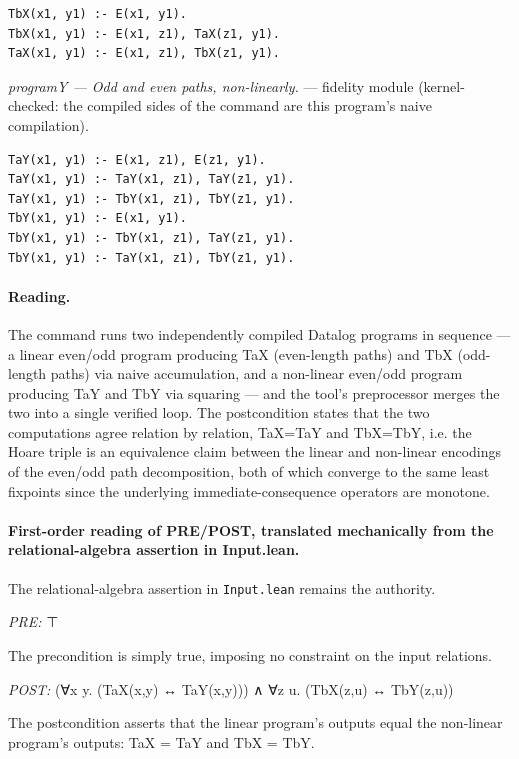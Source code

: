 \documentclass[10pt]{article}
\begin{document}
\begin{Verbatim}[fontsize=\scriptsize,breaklines=true,breakanywhere=true,frame=single,framesep=1.5mm]
TbX(x1, y1) :- E(x1, y1).
TbX(x1, y1) :- E(x1, z1), TaX(z1, y1).
TaX(x1, y1) :- E(x1, z1), TbX(z1, y1).
\end{Verbatim}

{\raggedright\textit{programY --- Odd and even paths, non-linearly.} --- fidelity module (kernel-checked: the compiled sides of the command are this program's naive compilation).\par}

\begin{Verbatim}[fontsize=\scriptsize,breaklines=true,breakanywhere=true,frame=single,framesep=1.5mm]
TaY(x1, y1) :- E(x1, z1), E(z1, y1).
TaY(x1, y1) :- TaY(x1, z1), TaY(z1, y1).
TaY(x1, y1) :- TbY(x1, z1), TbY(z1, y1).
TbY(x1, y1) :- E(x1, y1).
TbY(x1, y1) :- TbY(x1, z1), TaY(z1, y1).
TbY(x1, y1) :- TaY(x1, z1), TbY(z1, y1).
\end{Verbatim}

\paragraph{Reading.} The command runs two independently compiled Datalog programs in sequence --- a linear even/odd program producing TaX (even-length paths) and TbX (odd-length paths) via naive accumulation, and a non-linear even/odd program producing TaY and TbY via squaring --- and the tool's preprocessor merges the two into a single verified loop. The postcondition states that the two computations agree relation by relation, TaX=TaY and TbX=TbY, i.e. the Hoare triple is an equivalence claim between the linear and non-linear encodings of the even/odd path decomposition, both of which converge to the same least fixpoints since the underlying immediate-consequence operators are monotone.

\paragraph{First-order reading of PRE/POST, translated mechanically from the relational-algebra assertion in Input.lean.} The relational-algebra assertion in \texttt{Input.lean} remains the authority.

\textit{PRE:} ⊤\par The precondition is simply true, imposing no constraint on the input relations.

\textit{POST:} (∀x y. (TaX(x,y) ↔ TaY(x,y))) ∧ ∀z u. (TbX(z,u) ↔ TbY(z,u))\par The postcondition asserts that the linear program's outputs equal the non-linear program's outputs: TaX = TaY and TbX = TbY.
\end{document}
